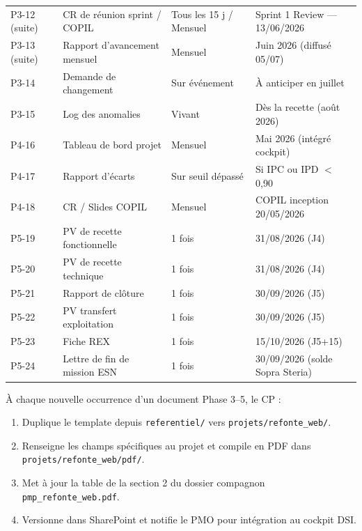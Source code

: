 \documentclass[11pt,a4paper,oneside]{report}
\begin{document}
\renewcommand{\arraystretch}{1.3}
\begin{tabularx}{\textwidth}{C{1.2cm} L{5cm} C{2.5cm} Y}
\toprule
{} &  &  &  \\
\midrule
P3-12 (suite) & CR de réunion sprint / COPIL & Tous les 15 j / Mensuel & Sprint 1 Review --- 13/06/2026 \\
P3-13 (suite) & Rapport d'avancement mensuel & Mensuel             & Juin 2026 (diffusé 05/07) \\
P3-14         & Demande de changement        & Sur événement       & À anticiper en juillet \\
P3-15         & Log des anomalies            & Vivant              & Dès la recette (août 2026) \\
P4-16         & Tableau de bord projet       & Mensuel             & Mai 2026 (intégré cockpit) \\
P4-17         & Rapport d'écarts             & Sur seuil dépassé   & Si IPC ou IPD $<$ 0{,}90 \\
P4-18         & CR / Slides COPIL            & Mensuel             & COPIL inception 20/05/2026 \\
P5-19         & PV de recette fonctionnelle  & 1 fois              & 31/08/2026 (J4) \\
P5-20         & PV de recette technique      & 1 fois              & 31/08/2026 (J4) \\
P5-21         & Rapport de clôture           & 1 fois              & 30/09/2026 (J5) \\
P5-22         & PV transfert exploitation    & 1 fois              & 30/09/2026 (J5) \\
P5-23         & Fiche REX                    & 1 fois              & 15/10/2026 (J5+15) \\
P5-24         & Lettre de fin de mission ESN & 1 fois              & 30/09/2026 (solde Sopra Steria) \\
\bottomrule
\end{tabularx}

\begin{reco}
À chaque nouvelle occurrence d'un document Phase 3--5, le CP :
\begin{enumerate}
  \item Duplique le template depuis \texttt{referentiel/} vers \texttt{projets/refonte\_web/}.
  \item Renseigne les champs spécifiques au projet et compile en PDF dans \texttt{projets/refonte\_web/pdf/}.
  \item Met à jour la table de la section 2 du dossier compagnon \texttt{pmp\_refonte\_web.pdf}.
  \item Versionne dans SharePoint et notifie le PMO pour intégration au cockpit DSI.
\end{enumerate}
\end{reco}
\end{document}

